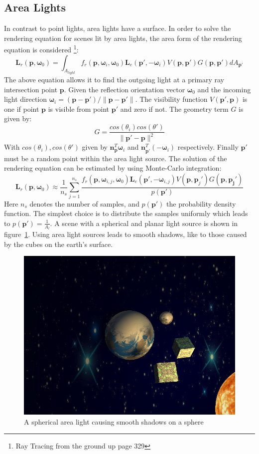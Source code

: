 \subsection{Area Lights}
In contrast to point lights, area lights have a surface. In order to solve the rendering equation for scenes lit by area lights, the area form of the rendering equation is considered \footnote{Ray Tracing from the ground up page 329}:
\begin{equation}
\mathbf{L}_r(\mathbf{p},\mathbf{\omega}_0) = \int_{A_{light}} f_r(\mathbf{p},\mathbf{\omega}_i,\mathbf{\omega}_0) \mathbf{L}_e(\mathbf{p}',-\mathbf{\omega}_i)V(\mathbf{p},\mathbf{p}')G(\mathbf{p},\mathbf{p}')dA_{\mathbf{p}'}
\end{equation}
The above equation allows it to find the outgoing light at a primary ray intersection point $\mathbf{p}$. Given the reflection orientation vector $\mathbf{\omega}_0$ and the incoming light direction $\mathbf{\omega}_i = (\mathbf{p} - \mathbf{p}') / \|\mathbf{p} - \mathbf{p}'\|$. The visibility function $V(\mathbf{p}',\mathbf{p})$ is one if point $\mathbf{p}$ is visible from point $\mathbf{p}'$ and zero if not. The geometry term $G$ is given by:
\begin{equation}
G = \frac{cos (\theta_i) cos (\theta')}{\| \mathbf{p}' - \mathbf{p}\| ^ 2}
\end{equation}  
With $cos (\theta_i), cos (\theta')$ given by $\mathbf{n}_\mathbf{p} ^ T \mathbf{\omega}_i$ and $\mathbf{n}^{T}_{\mathbf{p}'} (-\mathbf{\omega}_i)$ respectively. Finally $\mathbf{p}'$ must be a random point within the area light source.
The solution of the rendering equation can be estimated by using Monte-Carlo integration:
\begin{equation}
\mathbf{L}_r(\mathbf{p},\mathbf{\omega}_0) \approx \frac{1}{n_s} \sum_{j=1}^{n_s} \frac{f_r(\mathbf{p},\mathbf{\omega}_{i,j},\mathbf{\omega}_0) \mathbf{L}_e(\mathbf{p}',-\mathbf{\omega}_{i,j})V(\mathbf{p},\mathbf{p}_j')G(\mathbf{p},\mathbf{p_j}')}{p(\mathbf{p}')}
\end{equation}
Here $n_s$ denotes the number of samples, and $p(\mathbf{p}')$ the probability density function. The simplest choice is to distribute the samples uniformly which leads to $p(\mathbf{p}') = \frac{1}{A_l}$. A scene with a spherical and planar light source is shown in figure~\ref{fig:borgEarth}. Using area light sources leads to smooth shadows, like to those caused by the cubes on the earth's surface. 


\begin{figure}
\centering
\includegraphics[width=0.5\linewidth]{./img/borgEarth3}
\caption{A spherical area light causing smooth shadows on a sphere}
\label{fig:borgEarth}
\end{figure}

